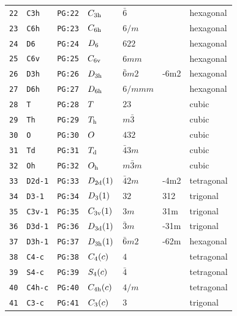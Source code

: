 \documentclass[fleqn,10pt]{jsarticle}
\begin{document}
\begin{center}
\begin{longtable}{lllllll}
\texttt{22} & \texttt{C3h} & \texttt{PG:22} & $C_{\rm 3h}$ & $\bar{6}$ &  & hexagonal \\
\texttt{23} & \texttt{C6h} & \texttt{PG:23} & $C_{\rm 6h}$ & $6/m$ &  & hexagonal \\
\texttt{24} & \texttt{D6} & \texttt{PG:24} & $D_{\rm 6}$ & $622$ &  & hexagonal \\
\texttt{25} & \texttt{C6v} & \texttt{PG:25} & $C_{\rm 6v}$ & $6mm$ &  & hexagonal \\
\texttt{26} & \texttt{D3h} & \texttt{PG:26} & $D_{\rm 3h}$ & $\bar{6}m2$ & -6m2 & hexagonal \\
\texttt{27} & \texttt{D6h} & \texttt{PG:27} & $D_{\rm 6h}$ & $6/mmm$ &  & hexagonal \\ \hline
\texttt{28} & \texttt{T} & \texttt{PG:28} & $T_{\rm }$ & $23$ &  & cubic \\
\texttt{29} & \texttt{Th} & \texttt{PG:29} & $T_{\rm h}$ & $m\bar{3}$ &  & cubic \\
\texttt{30} & \texttt{O} & \texttt{PG:30} & $O_{\rm }$ & $432$ &  & cubic \\
\texttt{31} & \texttt{Td} & \texttt{PG:31} & $T_{\rm d}$ & $\bar{4}3m$ &  & cubic \\
\texttt{32} & \texttt{Oh} & \texttt{PG:32} & $O_{\rm h}$ & $m\bar{3}m$ &  & cubic \\ \hline
\texttt{33} & \texttt{D2d-1} & \texttt{PG:33} & $D_{\rm 2d}(1)$ & $\bar{4}2m$ & -4m2 & tetragonal \\ \hline
\texttt{34} & \texttt{D3-1} & \texttt{PG:34} & $D_{\rm 3}(1)$ & $32$ & 312 & trigonal \\
\texttt{35} & \texttt{C3v-1} & \texttt{PG:35} & $C_{\rm 3v}(1)$ & $3m$ & 31m & trigonal \\
\texttt{36} & \texttt{D3d-1} & \texttt{PG:36} & $D_{\rm 3d}(1)$ & $\bar{3}m$ & -31m & trigonal \\ \hline
\texttt{37} & \texttt{D3h-1} & \texttt{PG:37} & $D_{\rm 3h}(1)$ & $\bar{6}m2$ & -62m & hexagonal \\ \hline
\texttt{38} & \texttt{C4-c} & \texttt{PG:38} & $C_{\rm 4}(c)$ & $4$ &  & tetragonal \\
\texttt{39} & \texttt{S4-c} & \texttt{PG:39} & $S_{\rm 4}(c)$ & $\bar{4}$ &  & tetragonal \\
\texttt{40} & \texttt{C4h-c} & \texttt{PG:40} & $C_{\rm 4h}(c)$ & $4/m$ &  & tetragonal \\ \hline
\texttt{41} & \texttt{C3-c} & \texttt{PG:41} & $C_{\rm 3}(c)$ & $3$ &  & trigonal \\

\end{longtable}
\end{center}
\end{document}
